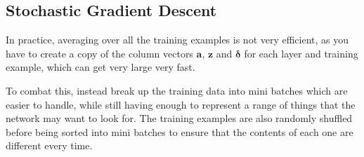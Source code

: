 \documentclass[12pt]{report}
\begin{document}
\subsection{Stochastic Gradient Descent}\label{sec:sgd}
In practice, averaging over all the training examples is not very efficient, as you have to create a copy of the column vectors $\mathbf{a}$, $\mathbf{z}$ and $\bm{\delta}$ for each layer and training example, which can get very large very fast.

To combat this, instead break up the training data into mini batches which are easier to handle, while still having enough to represent a range of things that the network may want to look for. The training examples are also randomly shuffled before being sorted into mini batches to ensure that the contents of each one are different every time.
\end{document}
